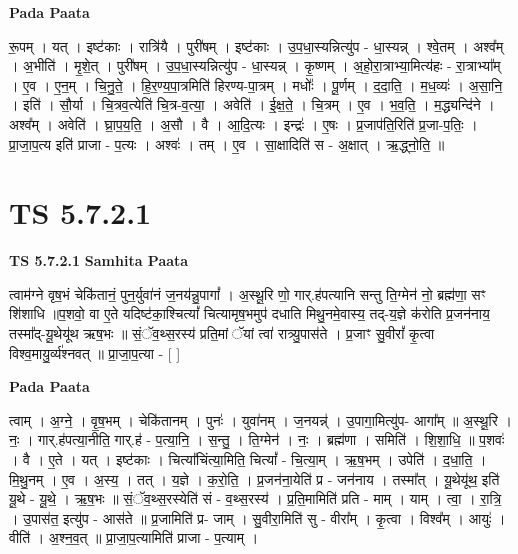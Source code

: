 \documentclass[17pt]{extarticle}
\begin{document}
\textbf{Pada Paata} \newline

रू॒पम् । यत् । इष्ट॑काः । रात्रि॑यै । पुरी॑षम् । इष्ट॑काः । उ॒प॒धा॒स्यन्नित्यु॑प - धा॒स्यन्न् । श्वे॒तम् । अश्व᳚म् । अ॒भीति॑ । मृ॒शे॒त् । पुरी॑षम् । उ॒प॒धा॒स्यन्नित्यु॑प - धा॒स्यन्न् । कृ॒ष्णम् । अ॒हो॒रा॒त्राभ्या॒मित्य॑हः - रा॒त्राभ्या᳚म् । ए॒व । ए॒न॒म् । चि॒नु॒ते॒ । हि॒र॒ण्य॒पा॒त्रमिति॑ हिरण्य-पा॒त्रम् । मधोः᳚ । पू॒र्णम् । द॒दा॒ति॒ । म॒ध॒व्यः॑ । अ॒सा॒नि॒ । इति॑ । सौ॒र्या । चि॒त्रव॒त्येति॑ चि॒त्र-व॒त्या॒ । अवेति॑ । ई॒क्ष॒ते॒ । चि॒त्रम् । ए॒व । भ॒व॒ति॒ । म॒द्ध्यन्दि॑ने । अश्व᳚म् । अवेति॑ । घ्रा॒प॒य॒ति॒ । अ॒सौ । वै । आ॒दि॒त्यः । इन्द्रः॑ । ए॒षः । प्र॒जाप॑ति॒रिति॑ प्र॒जा-प॒तिः॒ । प्रा॒जा॒प॒त्य इति॑ प्राजा - प॒त्यः । अश्वः॑ । तम् । ए॒व । सा॒क्षादिति॑ स - अ॒क्षात् । ऋ॒द्ध्नो॒ति॒ ॥  \newline




\section*{ TS 5.7.2.1 }

\textbf{TS 5.7.2.1 } \newline
\textbf{Samhita Paata} \newline

त्वाम॑ग्ने वृष॒भं चेकि॑तानं॒ पुन॒र्युवा॑नं ज॒नय॑न्नु॒पागां᳚ । अ॒स्थू॒रि णो॒ गार्.ह॑पत्यानि सन्तु ति॒ग्मेन॑ नो॒ ब्रह्म॑णा॒ सꣳ शि॑शाधि ॥प॒शवो॒ वा ए॒ते यदिष्ट॑का॒श्चित्यां᳚ चित्यामृष॒भमुप॑ दधाति मिथु॒नमे॒वास्य॒ तद्-य॒ज्ञे क॑रोति प्र॒जन॑नाय॒ तस्मा᳚द्-यू॒थेयू॑थ ऋष॒भः ॥ सं॒ॅव॒थ्स॒रस्य॑ प्रति॒मां ॅयां त्वा॑ रात्र्यु॒पास॑ते । प्र॒जाꣳ सु॒वीरां᳚ कृ॒त्वा विश्व॒मायु॒र्व्य॑श्नवत् ॥ प्रा॒जा॒प॒त्या - [  ] \newline

\textbf{Pada Paata} \newline

त्वाम् । अ॒ग्ने॒ । वृ॒ष॒भम् । चेकि॑तानम् । पुनः॑ । युवा॑नम् । ज॒नयन्न्॑ । उ॒पागा॒मित्यु॑प- आगा᳚म् ॥ अ॒स्थू॒रि । नः॒ । गार्.ह॑पत्या॒नीति॒ गार्.ह॑ - प॒त्या॒नि॒ । स॒न्तु॒ । ति॒ग्मेन॑ । नः॒ । ब्रह्म॑णा । समिति॑ । शि॒शा॒धि॒ ॥ प॒शवः॑ । वै । ए॒ते । यत् । इष्ट॑काः । चित्या᳚चिंत्या॒मिति॒ चित्यां᳚ - चि॒त्या॒म् । ऋ॒ष॒भम् । उपेति॑ । द॒धा॒ति॒ । मि॒थु॒नम् । ए॒व । अ॒स्य॒ । तत् । य॒ज्ञे । क॒रो॒ति॒ । प्र॒जन॑ना॒येति॑ प्र - जन॑नाय । तस्मा᳚त् । यू॒थेयू॑थ॒ इति॑ यू॒थे - यू॒थे॒ । ऋ॒ष॒भः ॥ सं॒ॅव॒थ्स॒रस्येति॑ सं - व॒थ्स॒रस्य॑ । प्र॒ति॒मामिति॑ प्रति - माम् । याम् । त्वा॒ । रा॒त्रि॒ । उ॒पास॑त॒ इत्यु॑प - आस॑ते ॥ प्र॒जामिति॑ प्र- जाम् । सु॒वीरा॒मिति॑ सु - वीरा᳚म् । कृ॒त्वा । विश्व᳚म् । आयुः॑ । वीति॑ । अ॒श्न॒व॒त् ॥ प्रा॒जा॒प॒त्यामिति॑ प्राजा - प॒त्याम् ।  \newline
\end{document}
